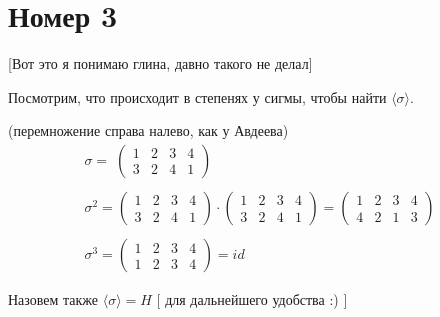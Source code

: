 \documentclass[a4paper,12pt]{article}
\begin{document}
\section*{Номер 3}
\begin{center}
[Вот это я понимаю глина, давно такого не делал]
\end{center}

Посмотрим, что происходит в степенях у сигмы, чтобы найти $\langle \sigma \rangle$. 

(перемножение справа налево, как у Авдеева)
\begin{equation*}
\begin{array}{lcl} 
\sigma = \;\begin{pmatrix}
1 & 2 & 3 &4 \\ 3 & 2 & 4 & 1 
\end{pmatrix}
\\\\
\sigma^2 = \begin{pmatrix}
1 & 2 & 3 &4 \\ 3 & 2 & 4 & 1 
\end{pmatrix} \cdot \begin{pmatrix}
1 & 2 & 3 &4 \\ 3 & 2 & 4 & 1 
\end{pmatrix} = \begin{pmatrix}
1 & 2 & 3 & 4 \\ 4 & 2 & 1 & 3
\end{pmatrix}
\\\\
\sigma^3 = \begin{pmatrix}
1 & 2 & 3 &4 \\ 1 & 2 & 3 & 4
\end{pmatrix} = id 
\end{array}
\end{equation*}



Назовем также $ \langle \sigma \rangle = H $ [ для дальнейшего удобства :) ]
\end{document}
